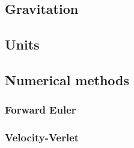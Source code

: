 \subsection{Gravitation}


\subsection{Units}


\subsection{Numerical methods}

\subsubsection{Forward Euler}

\subsubsection{Velocity-Verlet}
